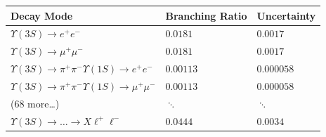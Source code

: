 \documentclass[landscape]{article}
\begin{document}
\begin{minipage}{8 in}
\vspace{1 cm}
\begin{tabular}{p{4.6 in} p{2 in} p{1.3 in}}
Decay Mode & Branching Ratio & Uncertainty \\\hline
$   \Upsilon(3S) \to e^+ e^-                                                                                           $ & $   0.0181      $ & $   0.0017     $ \\ 
$   \Upsilon(3S) \to \mu^+ \mu^-                                                                                       $ & $   0.0181      $ & $   0.0017     $ \\ 
$   \Upsilon(3S) \to \pi^+ \pi^- \Upsilon(1S) \to e^+ e^-                                                              $ & $   0.00113     $ & $   0.000058   $ \\ 
$   \Upsilon(3S) \to \pi^+ \pi^- \Upsilon(1S) \to \mu^+ \mu^-                                                          $ & $   0.00113     $ & $   0.000058   $ \\
\hspace{2 cm} (68 more\ldots) & \hspace{0.25 cm} $\ddots$ & \hspace{0.25 cm} $\ddots$ \\\hline\hline
$   \Upsilon(3S) \to \ldots \to X \ell^+ \ell^-                                                    $ & $   0.0444      $ & $   0.0034     $ \\\hline
\end{tabular} \\
\end{minipage}

\end{document}
